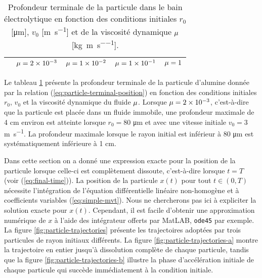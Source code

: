 \begin{table}
  \begin{center}
    \caption{Profondeur terminale de la particule dans le bain
      électrolytique en fonction des conditions initiales $r_0$
      [\si{\micro\meter}], $v_0$ [\si{\meter\per\second}] et de la
      viscosité dynamique $\mu$
      [\si{\kilo\gram\per\meter\per\second}].}
    \label{tab:fall-results}
    \begin{tabularx}{\textwidth}{@{}lXXXX@{}}
      \toprule
      & $\mu = \num{2e-3}$ & $\mu = \num{1e-2}$ & $\mu = \num{1e-1}$ & $\mu = \num{1}$ \\
      \midrule
      
      \bottomrule
    \end{tabularx}
  \end{center}
\end{table}

Le tableau \ref{tab:fall-results} présente la profondeur terminale de
la particule d'alumine donnée par la relation
(\ref{eq:particle-terminal-position}) en fonction des conditions
initiales $r_0$, $v_0$ et la viscosité dynamique du fluide
$\mu$. Lorsque $\mu = \num{2e-3}$,
c'est-à-dire que la particule est placée dans un fluide immobile, une
profondeur maximale de \num{4} \si{\centi\meter} environ est atteinte
lorsque $r_0 = \num{80}$ \si{\micro\meter} et avec une vitesse
initiale $v_0 = \num{3}$ \si{\meter\per\second}. La profondeur
maximale lorsque le rayon initial est inférieur à \num{80}
\si{\micro\meter} est systématiquement inférieure à \num{1}
\si{\centi\meter}.

Dans cette section on a donné une expression exacte pour la position
de la particule lorsque celle-ci est complètement dissoute,
c'est-à-dire lorsque $t = T$ (voir (\ref{eq:final-time})). La position
de la particule $x(t)$ pour tout $t \in(0, T)$ nécessite l'intégration
de l'équation différentielle linéaire non-homogène et à coefficients
variables (\ref{eq:simple-mvt}). Nous ne chercherons pas ici à
expliciter la solution exacte pour $x(t)$. Cependant, il est facile
d'obtenir une approximation numérique de $x$ à l'aide des intégrateur
offerts par MatLAB\textregistered, \texttt{ode45} par exemple. La
figure \ref{fig:particle-trajectories} présente les trajectoires
adoptées par trois particules de rayon initiaux différents. La figure
\ref{fig:particle-trajectories-a} montre la trajectoire en entier
jusqu'à dissolution complète de chaque particule, tandis que la figure
\ref{fig:particle-trajectories-b} illustre la phase d'accélération
initiale de chaque particule qui succède immédiatement à la condition
initiale.

